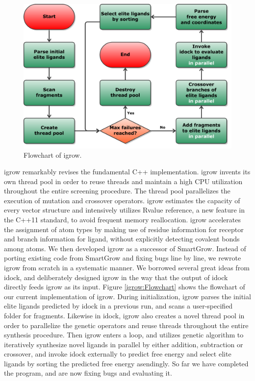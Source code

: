 \documentclass[10pt, conference, compsocconf]{IEEEtran}
\begin{document}
\begin{figure}
\centering
\includegraphics[width=\linewidth]{../igrow/Flowchart.pdf}
\caption{Flowchart of igrow.}
\label{fig:Flowchart}
\end{figure}

igrow remarkably revises the fundamental C++ implementation. igrow invents its own thread pool in order to reuse threads and maintain a high CPU utilization throughout the entire screening procedure. The thread pool parallelizes the execution of mutation and crossover operators. igrow estimates the capacity of every vector structure and intensively utilizes Rvalue reference, a new feature in the C++11 standard, to avoid frequent memory reallocation. igrow accelerates the assignment of atom types by making use of residue information for receptor and branch information for ligand, without explicitly detecting covalent bonds among atoms.
We then developed igrow as a successor of SmartGrow. Instead of porting existing code from SmartGrow and fixing bugs line by line, we rewrote igrow from scratch in a systematic manner. We borrowed several great ideas from idock, and deliberately designed igrow in the way that the output of idock directly feeds igrow as its input. Figure \ref{igrow:Flowchart} shows the flowchart of our current implementation of igrow. During initialization, igrow parses the initial elite ligands predicted by idock in a previous run, and scans a user-specified folder for fragments. Likewise in idock, igrow also creates a novel thread pool in order to parallelize the genetic operators and reuse threads throughout the entire synthesis procedure. Then igrow enters a loop, and utilizes genetic algorithm to iteratively synthesize novel ligands in parallel by either addition, subtraction or crossover, and invoke idock externally to predict free energy and select elite ligands by sorting the predicted free energy asendingly. So far we have completed the program, and are now fixing bugs and evaluating it.
\end{document}
